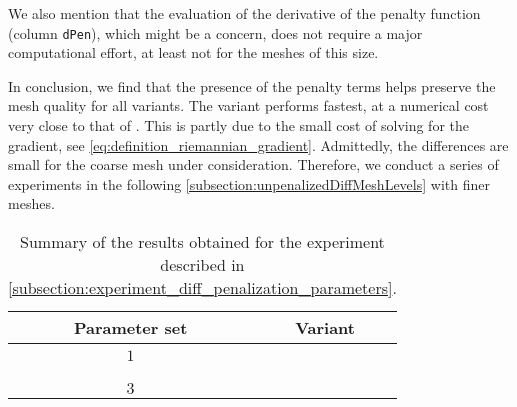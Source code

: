 We also mention that the evaluation of the derivative of the penalty function (column \texttt{dPen}), which might be a concern, does not require a major computational effort, at least not for the meshes of this size.

In conclusion, we find that the presence of the penalty terms helps preserve the mesh quality for all variants.
The variant \CompEuc performs fastest, at a numerical cost very close to that of \EucEuc.
This is partly due to the small cost of solving for the gradient, see \eqref{eq:definition_riemannian_gradient}.
Admittedly, the differences are small for the coarse mesh under consideration.
Therefore, we conduct a series of experiments in the following \cref{subsection:unpenalizedDiffMeshLevels} with finer meshes.

\begin{table}[htp]
	\centering
	\begin{tabular}{c|c}
		\toprule
		Parameter set & Variant \\
		\midrule
		\multirow{4}{*}{$1$}
		& \EucEuc    \\
		& \ElasEuc   \\
		& \CompEuc   \\
		\midrule
		\multirow{4}{*}{$2$}
		& \EucEuc    \\
		& \ElasEuc   \\
		& \CompEuc   \\
		\midrule
		\multirow{4}{*}{$3$}
		& \EucEuc  \\
		& \ElasEuc  \\
		& \CompEuc  \\
		\bottomrule
	\end{tabular}%
	\caption{Summary of the results obtained for the experiment described in \cref{subsection:experiment_diff_penalization_parameters}.}
	\label{table:experiment_diff_penalization_parameters}
\end{table}

